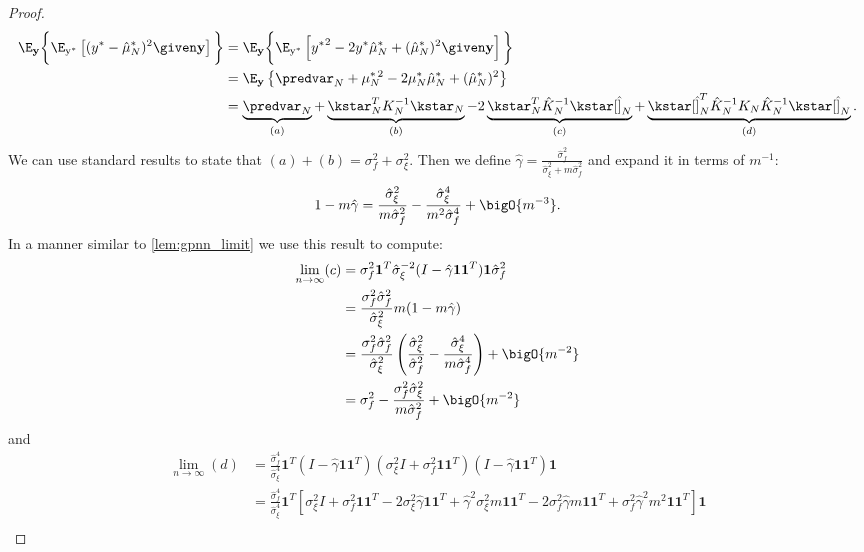 \begin{proof}\label{proof:mismatched_mse_limit}
\begin{align*}
        \E_\mathbf{y}\bigg\{\E_\mathrm{y^*}\left[(y^* - \hat{\mu}_N^*)^2 \given \mathbf{y}\right] \bigg\}
        &= \E_\mathbf{y}\bigg\{\E_\mathrm{y^*}\left[{y^*}^2 - 2y^*\hat{\mu}_N^* + (\hat{\mu}_N^*)^2\given \mathbf{y}\right]\bigg\} \\
        &= \E_\mathbf{y}\left\{\predvar_N + \mu^{*\,2}_N - 2\mu^*_N\hat{\mu}_N^* + (\hat{\mu}_N^*)^2 \right\} \\
        &= \underbrace{\predvar_N}_{(a)} + \underbrace{\kstar_N^TK_N^{-1}{\kstar_N}}_{(b)} - 2\underbrace{\kstar_N^T\hat{K}_N^{-1}\kstar[\hat]_N}_{(c)} + \underbrace{\kstar[\hat]_N^T\hat{K}_N^{-1}K_N\hat{K}_N^{-1}\kstar[\hat]_N}_{(d)}.
    \end{align*}
    We can use standard results to state that \((a)+(b)=\sigma_f^2+\sigma_\xi^2\).
    Then we define \(\hat{\gamma}=\frac{\hat{\sigma}_f^2}{\hat{\sigma}_\xi^2+m\hat{\sigma}_f^2}\) and expand it in terms of \(m^{-1}\):
    \[1-m\hat{\gamma} = \frac{\hat{\sigma}_\xi^2}{m\hat{\sigma}_f^2} - \frac{\hat{\sigma}_\xi^4}{m^2\hat{\sigma}_f^4} + \bigO{m^{-3}}. \] 
    In a manner similar to \autoref{lem:gpnn_limit} we use this result to compute:
    \begin{align*}
        \lim_{n\rightarrow\infty}(c) &= \sigma_f^2\bm{1}^T\hat{\sigma}_\xi^{-2}(I-\hat{\gamma}\bm{11}^T)\bm{1}\hat{\sigma}_f^2 \\
        &=\frac{\sigma_f^2\hat{\sigma}_f^2}{\hat{\sigma}_\xi^2}m(1-m\hat{\gamma})\\
        &=\frac{\sigma_f^2\hat{\sigma}_f^2}{\hat{\sigma}_\xi^2}\left(\frac{\hat{\sigma}_\xi^2}{\hat{\sigma}_f^2} - \frac{\hat{\sigma}_\xi^4}{m\hat{\sigma}_f^4}\right) + \bigO{m^{-2}} \\
        &= \sigma_f^2 - \frac{\sigma_f^2\hat{\sigma}_\xi^2}{m\hat{\sigma}_f^2} + \bigO{m^{-2}}
    \end{align*}
    and
    \begin{align*}
        \lim_{n\rightarrow\infty}(d) &= \frac{\hat{\sigma}_f^4}{\hat{\sigma}_\xi^4}\bm{1}^T(I-\hat{\gamma}\bm{11}^T)(\sigma_\xi^2I+\sigma_f^2\bm{11}^T)(I-\hat{\gamma}\bm{11}^T)\bm{1}\\
        &=\frac{\hat{\sigma}_f^4}{\hat{\sigma}_\xi^4}\bm{1}^T\left[\sigma_\xi^2I + \sigma_f^2\bm{11}^T - 2\sigma_\xi^2\hat{\gamma}\bm{11}^T + \hat{\gamma}^2\sigma_\xi^2m\bm{11}^T -2\sigma_f^2\hat{\gamma}m\bm{11}^T + \sigma_f^2\hat{\gamma}^2m^2\bm{11}^T\right]\bm{1}\\

\end{align*}
\end{proof}
